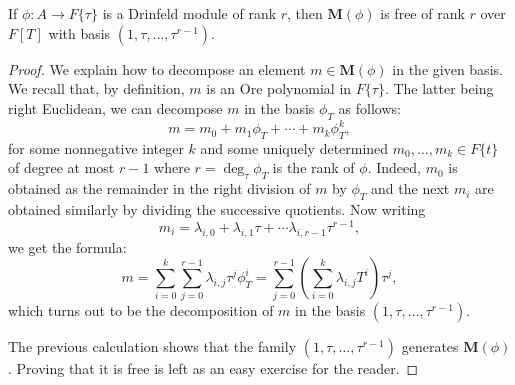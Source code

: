 \documentclass[10pt,a4paper]{amsart}
\newcommand{\MM}{\mathbf{M}}
\begin{document}
\begin{proposition}
\label{prop:basismotive}
If $\phi : A \to F\{\tau\}$ is a Drinfeld module of rank $r$,
then $\MM(\phi)$ is free of rank $r$ over $F[T]$ with basis
$(1, \tau, \ldots, \tau^{r-1})$.
\end{proposition}

\begin{proof}
We explain how to decompose an element $m \in \MM(\phi)$ in the
given basis. We recall that, by definition, $m$ is an Ore polynomial
in $F\{\tau\}$.
The latter being right Euclidean, we can decompose $m$ in the basis $\phi_T$ as follows:
$$m = m_0 + m_1 \phi_T + \cdots + m_k \phi_T^k,$$
for some nonnegative integer $k$ and some uniquely determined
$m_0, \ldots, m_k \in F\{t\}$ of degree at most $r{-}1$ where
$r = \deg_\tau \phi_T$ is the rank of $\phi$.
Indeed, $m_0$ is obtained as the remainder in the right division of
$m$ by $\phi_T$ and the next $m_i$ are obtained similarly by
dividing the successive quotients. Now writing
$$m_i =
\lambda_{i,0} + \lambda_{i,1} \tau + \cdots
\lambda_{i,r-1} \tau^{r-1},$$ we get the formula:
$$m = \sum_{i=0}^k \sum_{j=0}^{r-1} \lambda_{i,j} \tau^j \phi_T^i
    = \sum_{j=0}^{r-1} \left(\sum_{i=0}^k \lambda_{i,j} T^i\right) \tau^j,$$
which turns out to be the decomposition of $m$ in the basis
$(1, \tau, \ldots, \tau^{r-1})$.

The previous calculation shows that the family $(1, \tau, \ldots,
\tau^{r-1})$ generates $\MM(\phi)$. Proving that it is free is left
as an easy exercise for the reader.
\end{proof}
\end{document}
